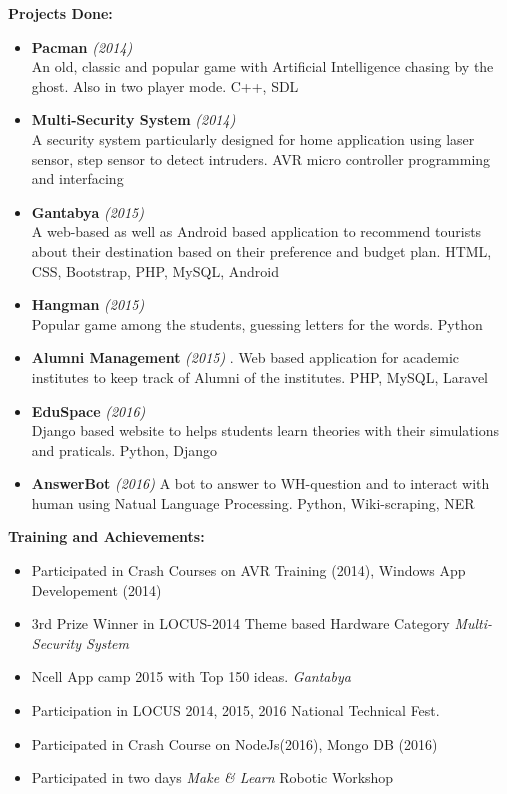 \documentclass[paper = a4paper, 12pt]{article}
\begin{document}
{\Large \textbf{Projects Done:} \\
}
\vspace{-5mm}
\begin{itemize}

	\item \textbf{Pacman } \emph{(2014)} \\
		\small An old, classic and popular game with Artificial Intelligence
		chasing by the ghost. Also in two player mode. C++, SDL
	\item \textbf{Multi-Security System} \emph{(2014)} \\
		\small A security system particularly designed for home application
		using laser sensor, step sensor to detect intruders. AVR 
		micro controller programming and interfacing
	\item \textbf{Gantabya} \emph{(2015)} \\
		\small A web-based as well as Android based application to recommend
		tourists about their destination based on their preference and budget
		plan. HTML, CSS, Bootstrap, PHP, MySQL, Android
	\item \textbf{Hangman} \emph{(2015)} \\
		\small Popular game among the students, guessing letters for the 
		words. Python
	\item \textbf{Alumni Management} \emph{(2015)}
		\small. Web based application for academic institutes to keep 
		track of Alumni of the institutes. PHP, MySQL, Laravel
	\item \textbf{EduSpace} \emph{(2016)} \\
		\small Django based website to helps students learn theories with
		their simulations and praticals. Python, Django
	\item \textbf{AnswerBot} \emph{(2016)}
		\small A bot to answer to WH-question and to interact with human
		using Natual Language Processing. Python, Wiki-scraping, NER
\end{itemize}

\vspace{8mm}
{\Large \textbf{ Training and Achievements: }\\ }
\vspace{-5mm}
\begin{itemize}
	\item  Participated in Crash Courses on AVR Training (2014), Windows 
	App Developement (2014)
	\item 3rd Prize Winner in LOCUS-2014 Theme based Hardware Category 
	\emph{Multi-Security System}
	\item Ncell App camp 2015 with Top 150 ideas. \emph{Gantabya}
	\item Participation in LOCUS 2014, 2015, 2016 National Technical Fest. 
	\item Participated in Crash Course on NodeJs(2016), Mongo DB (2016) 
	\item Participated in two days \emph{Make \& Learn } Robotic Workshop
\end{itemize}
\end{document}
